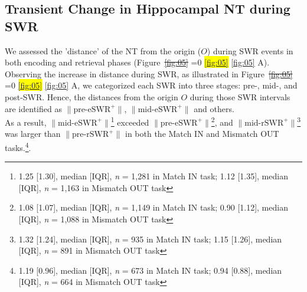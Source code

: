 \documentclass[preprint,review,12pt]{elsarticle}%
\newcommand{\hl}[1]{\colorbox{yellow}{#1}} %
\newcommand{\hlref}[1]{%
  \ifnum\getrefnumber{#1}=0 %
    \hl{\ref*{#1}}%
  \else %
    \ref{#1}%
  \fi %
} %
\providecommand{\DIFdeltex}[1]{{\protect\color{red}\sout{#1}}}                      %
\providecommand{\DIFaddbegin}{} %
\providecommand{\DIFaddend}{} %
\providecommand{\DIFdelbegin}{} %
\providecommand{\DIFdelend}{} %
\providecommand{\DIFdel}[1]{\texorpdfstring{\DIFdeltex{#1}}{}} %
\newcommand{\DIFscaledelfig}{0.5}
\newlength{\DIFdelgraphicswidth} %
\newlength{\DIFdelgraphicsheight} %
\newcommand{\DIFaddincludegraphics}[2][]{{\color{blue}\fbox{\DIFOincludegraphics[#1]{#2}}}} %
\newcommand{\DIFdelincludegraphics}[2][]{%
\sbox{\DIFdelgraphicsbox}{\DIFOincludegraphics[#1]{#2}}%
\settoboxwidth{\DIFdelgraphicswidth}{\DIFdelgraphicsbox} %
\settoboxtotalheight{\DIFdelgraphicsheight}{\DIFdelgraphicsbox} %
\scalebox{\DIFscaledelfig}{%
\parbox[b]{\DIFdelgraphicswidth}{\usebox{\DIFdelgraphicsbox}\\[-\baselineskip] \rule{\DIFdelgraphicswidth}{0em}}\llap{\resizebox{\DIFdelgraphicswidth}{\DIFdelgraphicsheight}{%
\setlength{\unitlength}{\DIFdelgraphicswidth}%
\begin{picture}(1,1)%
\thicklines\linethickness{2pt} %
{\color[rgb]{1,0,0}\put(0,0){\framebox(1,1){}}}%
{\color[rgb]{1,0,0}\put(0,0){\line( 1,1){1}}}%
{\color[rgb]{1,0,0}\put(0,1){\line(1,-1){1}}}%
\end{picture}%
}\hspace*{3pt}}} %
} %
\DeclareRobustCommand{\DIFaddbegin}{\DIFOaddbegin \let\includegraphics\DIFaddincludegraphics} %
\DeclareRobustCommand{\DIFaddend}{\DIFOaddend \let\includegraphics\DIFOincludegraphics} %
\DeclareRobustCommand{\DIFdelbegin}{\DIFOdelbegin \let\includegraphics\DIFdelincludegraphics} %
\DeclareRobustCommand{\DIFdelend}{\DIFOaddend \let\includegraphics\DIFOincludegraphics} %
\begin{document}
\DIFaddend \subsection{Transient Change in Hippocampal NT during SWR}
We assessed the 'distance' of the NT from the origin ($O$) during SWR events in both encoding and retrieval phases (Figure~\DIFdelbegin \DIFdel{\ref{fig:05}}\DIFdelend \DIFaddbegin \hlref{fig:05}\DIFaddend A). Observing the increase in distance during SWR, as illustrated in Figure~\DIFdelbegin \DIFdel{\ref{fig:05}}\DIFdelend \DIFaddbegin \hlref{fig:05}\DIFaddend A, we categorized each SWR into three stages: pre-, mid-, and post-SWR. Hence, the distances from the origin $O$ during those SWR intervals are identified as $\mathrm{\lVert \text{pre-eSWR}^+ \rVert}$, $\mathrm{\lVert \text{mid-eSWR}^+ \rVert}$ and others.
\\
\indent
As a result, $\mathrm{\lVert \text{mid-eSWR}^+ \rVert}$\footnote{1.25 [1.30], median [IQR], \textit{n} = 1,281 in Match IN task; 1.12 [1.35], median [IQR], \textit{n} = 1,163 in Mismatch OUT task} exceeded $\mathrm{\lVert \text{pre-eSWR}^+ \rVert}$\footnote{1.08 [1.07], median [IQR], \textit{n} = 1,149 in Match IN task; 0.90 [1.12], median [IQR], \textit{n} = 1,088 in Mismatch OUT task}, and $\mathrm{\lVert \text{mid-rSWR}^+ \rVert}$\footnote{1.32 [1.24], median [IQR], \textit{n} = 935 in Match IN task; 1.15 [1.26], median [IQR], \textit{n} = 891 in Mismatch OUT task} was larger than $\mathrm{\lVert \text{pre-rSWR}^+ \rVert}$ in both the Match IN and Mismatch OUT tasks.\footnote{1.19 [0.96], median [IQR], \textit{n} = 673 in Match IN task; 0.94 [0.88], median [IQR], \textit{n} = 664 in Mismatch OUT task}.
\end{document}
